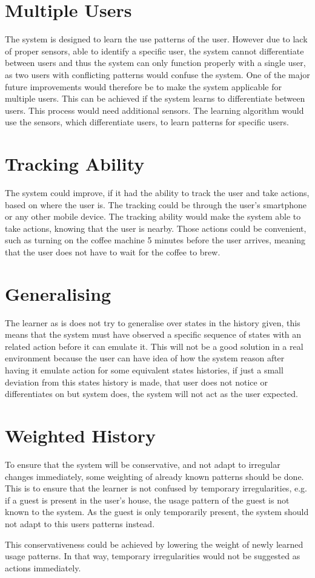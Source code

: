 \section{Multiple Users}
The system is designed to learn the use patterns of the user. However due to lack of proper sensors, able to identify a specific user, the system cannot differentiate between users and thus the system can only function properly with a single user, as two users with conflicting patterns would confuse the system. One of the major future improvements would therefore be to make the system applicable for multiple users. This can be achieved if the system learns to differentiate between users. This process would need additional sensors. The learning algorithm would use the sensors, which differentiate users, to learn patterns for specific users.

\section{Tracking Ability}
The system could improve, if it had the ability to track the user and take actions, based on where the user is. The tracking could be through the user's smartphone or any other mobile device. The tracking ability would make the system able to take actions, knowing that the user is nearby. Those actions could be  convenient, such as turning on the coffee machine 5 minutes before the user arrives, meaning that the user does not have to wait for the coffee to brew.

\section{Generalising}\label{sec:dis:generalise}
The learner as is does not try to generalise over states in the history given, this means that the system must have observed a specific sequence of states with an related action before it can emulate it. This will not be a good solution in a real environment because the user can have idea of how the system reason after having it emulate action for some equivalent states histories, if just a small deviation from this states history is made, that user does not notice or differentiates on but system does, the system will not act as the user expected.

\section{Weighted History}
To ensure that the system will be conservative, and not adapt to irregular changes immediately, some weighting of already known patterns should be done. This is to ensure that the learner is not confused by temporary irregularities, e.g. if a guest is present in the user's house, the usage pattern of the guest is not known to the system. As the guest is only temporarily present, the system should not adapt to this users patterns instead.

This conservativeness could be achieved by lowering the weight of newly learned usage patterns. In that way, temporary irregularities would not be suggested as actions immediately.
